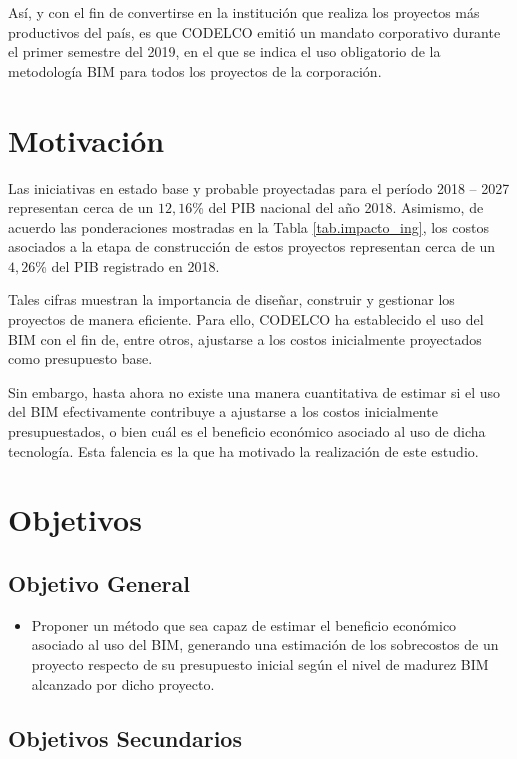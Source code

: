 Así, y con el fin de convertirse en la institución que realiza los proyectos más productivos del país, es que CODELCO emitió un mandato corporativo durante el primer semestre del 2019, en el que se indica el uso obligatorio de la metodología BIM para todos los proyectos de la corporación.

\section{Motivación}

Las iniciativas en estado base y probable proyectadas para el período 2018 -- 2027 representan cerca de un $12,16$\% del PIB nacional del año 2018. Asimismo, de acuerdo las ponderaciones mostradas en la Tabla \ref{tab.impacto_ing}, los costos asociados a la etapa de construcción de estos proyectos representan cerca de un $4,26$\% del PIB registrado en 2018.

Tales cifras muestran la importancia de diseñar, construir y gestionar los proyectos de manera eficiente. Para ello, CODELCO ha establecido el uso del BIM con el fin de, entre otros, ajustarse a los costos inicialmente proyectados como presupuesto base.

Sin embargo, hasta ahora no existe una manera cuantitativa de estimar si el uso del BIM efectivamente contribuye a ajustarse a los costos inicialmente presupuestados, o bien cuál es el beneficio económico asociado al uso de dicha tecnología. Esta falencia es la que ha motivado la realización de este estudio.

\section{Objetivos}

\subsection{Objetivo General}

\begin{itemize}
    \item Proponer un método que sea capaz de estimar el beneficio económico asociado al uso del BIM, generando una estimación de los sobrecostos de un proyecto respecto de su presupuesto inicial según el nivel de madurez BIM alcanzado por dicho proyecto.
\end{itemize}

\subsection{Objetivos Secundarios}

